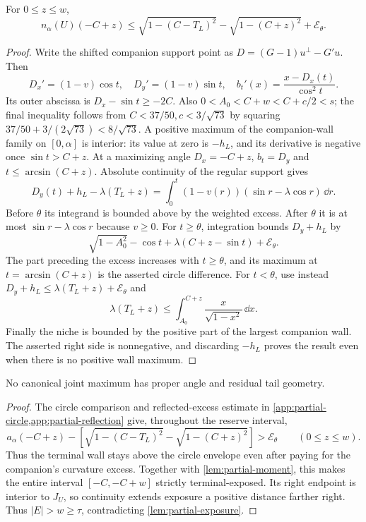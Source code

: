 \begin{lemma}\label{lem:partial-moment}
For $0\le z\le w$,
\[
 n_\alpha(U)(-C+z)\le
 \sqrt{1-(C-T_L)^2}-\sqrt{1-(C+z)^2}+\mathcal E_\theta.
\]
\end{lemma}
\begin{proof}
Write the shifted companion support point as
$D=(G-1)u^\perp-G'u$. Then
\[
 D_x'=(1-v)\cos t,\quad D_y'=(1-v)\sin t,\quad
 b_t'(x)=\frac{x-D_x(t)}{\cos^2t}.
\]
Its outer abscissa is $D_x-\sin t\ge-2C$.
Also $0<A_0<C+w<C+c/2<s$; the final inequality follows from
$C<37/50,c<3/\sqrt{73}$ by squaring
$37/50+3/(2\sqrt{73})<8/\sqrt{73}$.
A positive maximum of the companion-wall family on $[0,\alpha]$
is interior: its value at zero is $-h_L$, and its derivative is
negative once $\sin t>C+z$. At a maximizing angle
$D_x=-C+z$, $b_t=D_y$ and $t\le\arcsin(C+z)$.
Absolute continuity of the regular support gives
\[
 D_y(t)+h_L-\lambda(T_L+z)
   =\int_0^t(1-v(r))(\sin r-\lambda\cos r)\,\dd r.
\]
Before $\theta$ its integrand is bounded above by the weighted
excess. After $\theta$ it is at most
$\sin r-\lambda\cos r$ because $v\ge0$.
For $t\ge\theta$, integration bounds $D_y+h_L$ by
\[
 \sqrt{1-A_0^2}-\cos t
       +\lambda(C+z-\sin t)+\mathcal E_\theta.
\]
The part preceding the excess increases with $t\ge\theta$,
and its maximum at $t=\arcsin(C+z)$ is the asserted circle
difference. For $t<\theta$, use instead
$D_y+h_L\le\lambda(T_L+z)+\mathcal E_\theta$ and
\[
 \lambda(T_L+z)\le
 \int_{A_0}^{C+z}\frac{x}{\sqrt{1-x^2}}\,\dd x.
\]
Finally the niche is bounded by the positive part of the largest
companion wall. The asserted right side is nonnegative, and
discarding $-h_L$ proves the result even when there is no positive
wall maximum.
\end{proof}

\begin{lemma}\label{lem:partial-tail-contradiction}
No canonical joint maximum has proper angle and residual tail geometry.
\end{lemma}
\begin{proof}
The circle comparison and reflected-excess estimate in
\cref{app:partial-circle,app:partial-reflection} give, throughout the
reserve interval,
\[
 a_\alpha(-C+z)-
 \left[\sqrt{1-(C-T_L)^2}-\sqrt{1-(C+z)^2}\right]
       >\mathcal E_\theta\qquad(0\le z\le w).
\]
Thus the terminal wall stays above the circle envelope even after
paying for the companion's curvature excess. Together with
\cref{lem:partial-moment}, this makes
the entire interval $[-C,-C+w]$ strictly terminal-exposed.
Its right endpoint is interior to $J_U$, so continuity extends
exposure a positive distance farther right. Thus
$|E|>w\ge\tau$, contradicting \cref{lem:partial-exposure}.
\end{proof}

